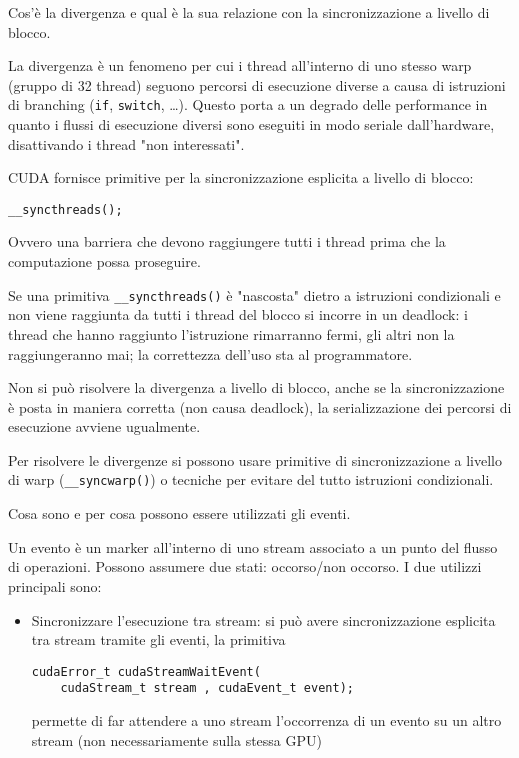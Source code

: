 \begin{questions}
    \question Cos'è la divergenza e qual è la sua relazione con la sincronizzazione a livello di blocco.
    
    \begin{solution}
        La divergenza è un fenomeno per cui i thread all'interno di uno stesso warp (gruppo di 32 thread) seguono percorsi di esecuzione diverse a causa di istruzioni di branching (\texttt{if}, \texttt{switch}, \dots). Questo porta a un degrado delle performance in quanto i flussi di esecuzione diversi sono eseguiti in modo seriale dall'hardware, disattivando i thread "non interessati".
        
        CUDA fornisce primitive per la sincronizzazione esplicita a livello di blocco: 
        \begin{verbatim}
__syncthreads();
        \end{verbatim}
        Ovvero una barriera che devono raggiungere tutti i thread prima che la computazione possa proseguire.
        
        Se una primitiva \texttt{\_\_syncthreads()} è "nascosta" dietro a istruzioni condizionali e non viene raggiunta da tutti i thread del blocco si incorre in un deadlock: i thread che hanno raggiunto l'istruzione rimarranno fermi, gli altri non la raggiungeranno mai; la correttezza dell'uso sta al programmatore.
        
        Non si può risolvere la divergenza a livello di blocco, anche se la sincronizzazione è posta in maniera corretta (non causa deadlock), la serializzazione dei percorsi di esecuzione avviene ugualmente. 
        
        Per risolvere le divergenze si possono usare primitive di sincronizzazione a livello di warp (\texttt{\_\_syncwarp()}) o tecniche per evitare del tutto istruzioni condizionali.
    \end{solution}
    
    \question Cosa sono e per cosa possono essere utilizzati gli eventi.
    
    \begin{solution}
        Un evento è un marker all'interno di uno stream associato a un punto del flusso di operazioni. Possono assumere due stati: occorso/non occorso. I due utilizzi principali sono: 
        \begin{itemize}
            \item Sincronizzare l'esecuzione tra stream: si può avere sincronizzazione esplicita tra stream tramite gli eventi, la primitiva
            \begin{verbatim}
cudaError_t cudaStreamWaitEvent(
    cudaStream_t stream , cudaEvent_t event);
            \end{verbatim}
            permette di far attendere a uno stream l'occorrenza di un evento su un altro stream (non necessariamente sulla stessa GPU)
            

\end{itemize}
\end{solution}
\end{questions}
